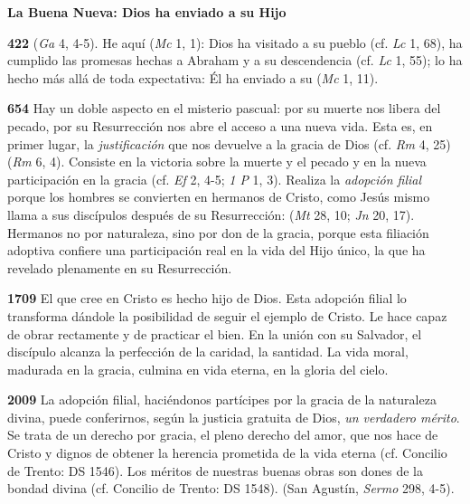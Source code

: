 \begin{body}
\begin{body}
\textbf{La Buena Nueva: Dios ha enviado a su Hijo}

\textbf{422}  (\emph{Ga} 4, 4-5). He aquí  (\emph{Mc} 1, 1): Dios ha visitado a su pueblo (cf. \emph{Lc} 1, 68), ha cumplido las promesas hechas a Abraham y a su descendencia (cf. \emph{Lc} 1, 55); lo ha hecho más allá de toda expectativa: Él ha enviado a su  (\emph{Mc} 1, 11).

\textbf{654} Hay un doble aspecto en el misterio pascual: por su muerte nos libera del pecado, por su Resurrección nos abre el acceso a una nueva vida. Esta es, en primer lugar, la \emph{justificación} que nos devuelve a la gracia de Dios (cf. \emph{Rm} 4, 25)  (\emph{Rm} 6, 4). Consiste en la victoria sobre la muerte y el pecado y en la nueva participación en la gracia (cf. \emph{Ef} 2, 4-5; \emph{1 P} 1, 3). Realiza la \emph{adopción filial} porque los hombres se convierten en hermanos de Cristo, como Jesús mismo llama a sus discípulos después de su Resurrección:  (\emph{Mt} 28, 10; \emph{Jn} 20, 17). Hermanos no por naturaleza, sino por don de la gracia, porque esta filiación adoptiva confiere una participación real en la vida del Hijo único, la que ha revelado plenamente en su Resurrección.

\textbf{1709} El que cree en Cristo es hecho hijo de Dios. Esta adopción filial lo transforma dándole la posibilidad de seguir el ejemplo de Cristo. Le hace capaz de obrar rectamente y de practicar el bien. En la unión con su Salvador, el discípulo alcanza la perfección de la caridad, la santidad. La vida moral, madurada en la gracia, culmina en vida eterna, en la gloria del cielo.

\textbf{2009} La adopción filial, haciéndonos partícipes por la gracia de la naturaleza divina, puede conferirnos, según la justicia gratuita de Dios, \emph{un verdadero mérito}. Se trata de un derecho por gracia, el pleno derecho del amor, que nos hace  de Cristo y dignos de obtener la herencia prometida de la vida eterna (cf. Concilio de Trento: DS 1546). Los méritos de nuestras buenas obras son dones de la bondad divina (cf. Concilio de Trento: DS 1548).  (San Agustín, \emph{Sermo} 298, 4-5).


\end{body}
\end{body}
